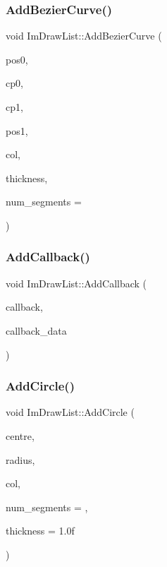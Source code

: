 \subsubsection{\texorpdfstring{Add\+Bezier\+Curve()}{AddBezierCurve()}}
{\footnotesize\ttfamily void Im\+Draw\+List\+::\+Add\+Bezier\+Curve (\begin{DoxyParamCaption}\item[{const \hyperlink{struct_im_vec2}{Im\+Vec2} \&}]{pos0,  }\item[{const \hyperlink{struct_im_vec2}{Im\+Vec2} \&}]{cp0,  }\item[{const \hyperlink{struct_im_vec2}{Im\+Vec2} \&}]{cp1,  }\item[{const \hyperlink{struct_im_vec2}{Im\+Vec2} \&}]{pos1,  }\item[{Im\+U32}]{col,  }\item[{float}]{thickness,  }\item[{int}]{num\+\_\+segments = {} }\end{DoxyParamCaption})}

\hypertarget{struct_im_draw_list_a14073d60ef9db9dc663dc7717a4893a5}{}\label{struct_im_draw_list_a14073d60ef9db9dc663dc7717a4893a5} 
\subsubsection{\texorpdfstring{Add\+Callback()}{AddCallback()}}
{\footnotesize\ttfamily void Im\+Draw\+List\+::\+Add\+Callback (\begin{DoxyParamCaption}\item[{Im\+Draw\+Callback}]{callback,  }\item[{void $\ast$}]{callback\+\_\+data }\end{DoxyParamCaption})}

\hypertarget{struct_im_draw_list_a26c34a87eca6aefa02ca4e4951dcd170}{}\label{struct_im_draw_list_a26c34a87eca6aefa02ca4e4951dcd170} 
\subsubsection{\texorpdfstring{Add\+Circle()}{AddCircle()}}
{\footnotesize\ttfamily void Im\+Draw\+List\+::\+Add\+Circle (\begin{DoxyParamCaption}\item[{const \hyperlink{struct_im_vec2}{Im\+Vec2} \&}]{centre,  }\item[{float}]{radius,  }\item[{Im\+U32}]{col,  }\item[{int}]{num\+\_\+segments = {},  }\item[{float}]{thickness = {\ttfamily 1.0f} }\end{DoxyParamCaption})}


